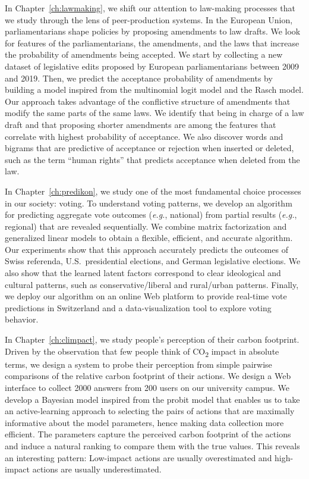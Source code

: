 In Chapter~\ref{ch:lawmaking}, we shift our attention to law-making processes that we study through the lens of peer-production systems.
In the European Union, parliamentarians shape policies by proposing amendments to law drafts.
We look for features of the parliamentarians, the amendments, and the laws that increase the probability of amendments being accepted.
We start by collecting a new dataset of  legislative edits proposed by European parliamentarians between 2009 and 2019.
Then, we predict the acceptance probability of amendments by building a model inspired from the multinomial logit model and the Rasch model.
Our approach takes advantage of the conflictive structure of amendments that modify the same parts of the same laws.
We identify that being in charge of a law draft and that proposing shorter amendments are among the features that correlate with highest probability of acceptance.
We also discover words and bigrams that are predictive of acceptance or rejection when inserted or deleted, such as the term ``human rights'' that predicts acceptance when deleted from the law.

In Chapter~\ref{ch:predikon}, we study one of the most fundamental choice processes in our society: voting.
To understand voting patterns, we develop an algorithm for predicting aggregate vote outcomes (\textit{e.g.}, national) from partial results (\textit{e.g.}, regional) that are revealed sequentially.
We combine matrix factorization and generalized linear models to obtain a flexible, efficient, and accurate algorithm.
Our experiments show that this approach accurately predicts the outcomes of Swiss referenda, U.S.\ presidential elections, and German legislative elections.
We also show that the learned latent factors correspond to clear ideological and cultural patterns, such as conservative/liberal and rural/urban patterns.
Finally, we deploy our algorithm on an online Web platform to provide real-time vote predictions in Switzerland and a data-visualization tool to explore voting behavior.

In Chapter~\ref{ch:climpact}, we study people's perception of their carbon footprint.
Driven by the observation that few people think of CO\textsubscript{2} impact in absolute terms, we design a system to probe their perception from simple pairwise comparisons of the relative carbon footprint of their actions.
We design a Web interface to collect 2000 answers from 200 users on our university campus.
We develop a Bayesian model inspired from the probit model that enables us to take an active-learning approach to selecting the pairs of actions that are maximally informative about the model parameters, hence making data collection more efficient.
The parameters capture the perceived carbon footprint of the actions and induce a natural ranking to compare them with the true values.
This reveals an interesting pattern:
Low-impact actions are usually overestimated and high-impact actions are usually underestimated.

